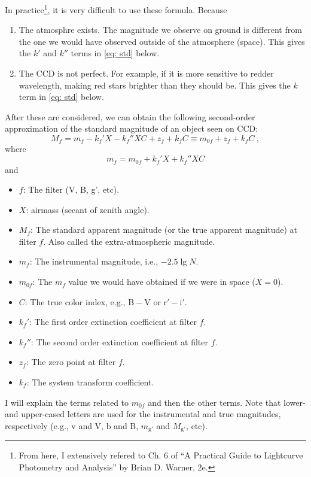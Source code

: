 In practice\footnote{From here, I extensively refered to Ch. 6 of ``A Practical Guide to Lightcurve Photometry and Analysis'' by Brian D. Warner, 2e.}, it is very difficult to use these formula. Because
\begin{enumerate}
\item The atmosphre exists. The magnitude we observe on ground is different from the one we would have observed outside of the atmosphere (space). This gives the $ k' $ and $ k'' $ terms in \cref{eq: std} below.
\item The CCD is not perfect. For example, if it is more sensitive to redder wavelength, making red stars brighter than they should be. This gives the $ k $ term in \cref{eq: std} below.
\end{enumerate}
After these are considered, we can obtain the following second-order approximation of the standard magnitude of an object seen on CCD:
\begin{equation}\label{eq: std}
  M_f = m_f - k_f' X - k_f''XC + z_f + k_f C \equiv m_{0f} + z_f + k_f C ~,
\end{equation}
where
\begin{equation}
  m_{f} = m_{0f} + k_f'X + k_f'' XC
\end{equation}
and
\begin{itemize}
\item $ f $: The filter (V, B, g', etc).
\item $ X $: airmass (secant of zenith angle).
\item $ M_f $: The standard apparent magnitude (or the true apparent magnitude) at filter $ f $. Also called the extra-atmospheric magnitude.
\item $ m_f $: The instrumental magnitude, i.e., $ -2.5 \lg N $.
\item $ m_{0f} $: The $ m_f $ value we would have obtained if we were in space ($ X = 0 $).
\item $ C $: The true color index, e.g., $ \mathrm{B} - \mathrm{V} $ or $ \mathrm{r'} - \mathrm{i'} $.
\item $ k_f' $: The first order extinction coefficient at filter $ f $.
\item $ k_f'' $: The second order extinction coefficient at filter $ f $.
\item $ z_f $: The zero point at filter $ f $.
\item $ k_f $: The system transform coefficient.
\end{itemize}
I will explain the terms related to $ m_{0f} $ and then the other terms. Note that lower- and upper-cased letters are used for the instrumental and true magnitudes, respectively (e.g., v and V, b and B, $ m_\mathrm{g'} $ and $ M_\mathrm{g'} $, etc).

